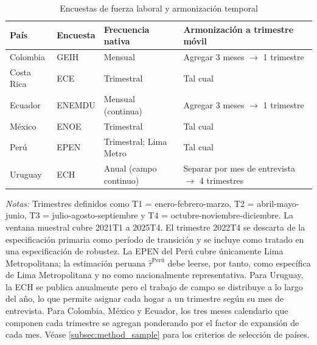 \begin{table}[H]
\centering
\small
\begin{threeparttable}
\caption{Encuestas de fuerza laboral y armonización temporal}
\label{tab:surveys}
\begin{tabular}{llll}
\toprule
País & Encuesta & Frecuencia nativa & Armonización a trimestre m\'{o}vil \\
\midrule
Colombia    & GEIH   & Mensual                     & Agregar 3 meses $\to$ 1 trimestre \\
Costa Rica  & ECE    & Trimestral                  & Tal cual \\
Ecuador     & ENEMDU & Mensual (continua)          & Agregar 3 meses $\to$ 1 trimestre \\
México      & ENOE   & Trimestral                  & Tal cual \\
Perú        & EPEN   & Trimestral; Lima Metro      & Tal cual \\
Uruguay     & ECH    & Anual (campo continuo)      & Separar por mes de entrevista $\to$ 4 trimestres \\
\bottomrule
\end{tabular}
\begin{tablenotes}[flushleft]
\footnotesize
\item \emph{Notas:} Trimestres definidos como T1 = enero-febrero-marzo, T2 = abril-mayo-junio, T3 = julio-agosto-septiembre y T4 = octubre-noviembre-diciembre. La ventana muestral cubre 2021T1 a 2025T4. El trimestre 2022T4 se descarta de la especificación primaria como período de transición y se incluye como tratado en una especificación de robustez. La EPEN del Perú cubre únicamente Lima Metropolitana; la estimación peruana $\hat\tau^{\text{Perú}}$ debe leerse, por tanto, como específica de Lima Metropolitana y no como nacionalmente representativa. Para Uruguay, la ECH se publica anualmente pero el trabajo de campo se distribuye a lo largo del año, lo que permite asignar cada hogar a un trimestre según su mes de entrevista. Para Colombia, México y Ecuador, los tres meses calendario que componen cada trimestre se agregan ponderando por el factor de expansión de cada mes. Véase \cref{subsec:method_sample} para los criterios de selección de países.
\end{tablenotes}
\end{threeparttable}
\end{table}

